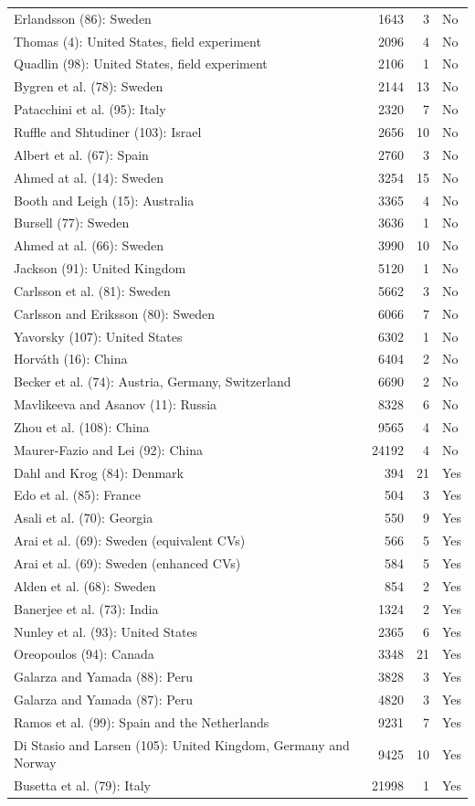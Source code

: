 \begin{table}
\begin{tabular}[t]{lrrl}
Erlandsson (86): Sweden & 1643 & 3 & No\\
Thomas (4): United States, field experiment & 2096 & 4 & No\\
\addlinespace
Quadlin (98): United States, field experiment & 2106 & 1 & No\\
Bygren et al. (78): Sweden & 2144 & 13 & No\\
Patacchini et al. (95): Italy & 2320 & 7 & No\\
Ruffle and Shtudiner (103): Israel & 2656 & 10 & No\\
Albert et al. (67): Spain & 2760 & 3 & No\\
\addlinespace
Ahmed at al. (14): Sweden & 3254 & 15 & No\\
Booth and Leigh (15): Australia & 3365 & 4 & No\\
Bursell (77): Sweden & 3636 & 1 & No\\
Ahmed at al. (66): Sweden & 3990 & 10 & No\\
Jackson (91): United Kingdom & 5120 & 1 & No\\
\addlinespace
Carlsson et al. (81): Sweden & 5662 & 3 & No\\
Carlsson and Eriksson (80): Sweden & 6066 & 7 & No\\
Yavorsky (107): United States & 6302 & 1 & No\\
Horváth (16): China & 6404 & 2 & No\\
Becker et al. (74): Austria, Germany, Switzerland & 6690 & 2 & No\\
\addlinespace
Mavlikeeva and Asanov (11): Russia & 8328 & 6 & No\\
Zhou et al. (108): China & 9565 & 4 & No\\
Maurer-Fazio and Lei (92): China & 24192 & 4 & No\\
Dahl and Krog (84): Denmark & 394 & 21 & Yes\\
Edo et al. (85): France & 504 & 3 & Yes\\
\addlinespace
Asali et al. (70): Georgia & 550 & 9 & Yes\\
Arai et al. (69): Sweden (equivalent CVs) & 566 & 5 & Yes\\
Arai et al. (69): Sweden (enhanced CVs) & 584 & 5 & Yes\\
Alden et al. (68): Sweden & 854 & 2 & Yes\\
Banerjee et al. (73): India & 1324 & 2 & Yes\\
\addlinespace
Nunley et al. (93): United States & 2365 & 6 & Yes\\
Oreopoulos (94): Canada & 3348 & 21 & Yes\\
Galarza and Yamada (88): Peru & 3828 & 3 & Yes\\
Galarza and Yamada (87): Peru & 4820 & 3 & Yes\\
Ramos et al. (99): Spain and the Netherlands & 9231 & 7 & Yes\\
\addlinespace
Di Stasio and Larsen (105): United Kingdom, Germany and Norway & 9425 & 10 & Yes\\
Busetta et al. (79): Italy & 21998 & 1 & Yes\\
\bottomrule
\end{tabular}
\end{table}
